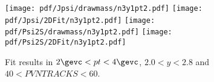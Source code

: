 \begin{figure}[H]
\begin{center}
\texttt{[image: pdf/Jpsi/drawmass/n3y1pt2.pdf]}
\texttt{[image: pdf/Jpsi/2DFit/n3y1pt2.pdf]}
\vspace*{-0.5cm}
\texttt{[image: pdf/Psi2S/drawmass/n3y1pt2.pdf]}
\texttt{[image: pdf/Psi2S/2DFit/n3y1pt2.pdf]}
\vspace*{-0.5cm}
\end{center}
\caption{Fit results in $2\gevc<pt<4\gevc$, $2.0<y<2.8$ and $40<PVNTRACKS<60$.}
\label{Fitn3y1pt2}
\end{figure}
